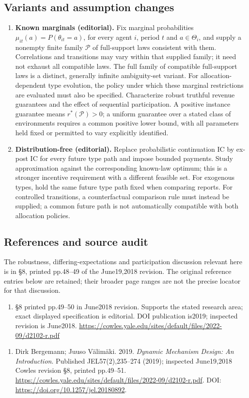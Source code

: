 \documentclass[11pt,a4paper]{article}
\begin{document}
\subsection*{Variants and assumption changes}
\begin{enumerate}
\item \textbf{Known marginals (editorial).} Fix marginal probabilities \(\mu_{it}(a)=P(\theta_{it}=a)\), for every agent \(i\), period \(t\) and \(a\in\Theta_i\), and supply a nonempty finite family \(\mathcal P\) of full-support laws consistent with them. Correlations and transitions may vary within that supplied family; it need not exhaust all compatible laws. The full family of compatible full-support laws is a distinct, generally infinite ambiguity-set variant. For allocation-dependent type evolution, the policy under which these marginal restrictions are evaluated must also be specified. Characterize robust truthful revenue guarantees and the effect of sequential participation. A positive instance guarantee means \(r^*(\mathcal P)>0\); a uniform guarantee over a stated class of environments requires a common positive lower bound, with all parameters held fixed or permitted to vary explicitly identified.
\item \textbf{Distribution-free (editorial).} Replace probabilistic continuation IC by ex-post IC for every future type path and impose bounded payments. Study approximation against the corresponding known-law optimum; this is a stronger incentive requirement with a different feasible set. For exogenous types, hold the same future type path fixed when comparing reports. For controlled transitions, a counterfactual comparison rule must instead be supplied; a common future path is not automatically compatible with both allocation policies.
\end{enumerate}
\subsection*{References and source audit}
The robustness, differing-expectations and participation discussion relevant here is in §8, printed pp.48–49 of the June19,2018 revision. The original reference entries below are retained; their broader page ranges are not the precise locator for that discussion.
\begin{enumerate}
\item §8 printed pp.49–50 in June2018 revision. Supports the stated research area; exact displayed specification is editorial. DOI publication is2019; inspected revision is June2018. \url{https://cowles.yale.edu/sites/default/files/2022-09/d2102-r.pdf}
\end{enumerate}
\begin{enumerate}\raggedright
\item\hypertarget{definitions:source:30007572:1}{} Dirk Bergemann; Juuso Välimäki. 2019. \emph{Dynamic Mechanism Design: An Introduction}. Published JEL57(2),235–274 (2019); inspected June19,2018 Cowles revision §8, printed pp.49–51.
\url{https://cowles.yale.edu/sites/default/files/2022-09/d2102-r.pdf}.
DOI: \url{https://doi.org/10.1257/jel.20180892}.
\end{enumerate}
\end{document}
